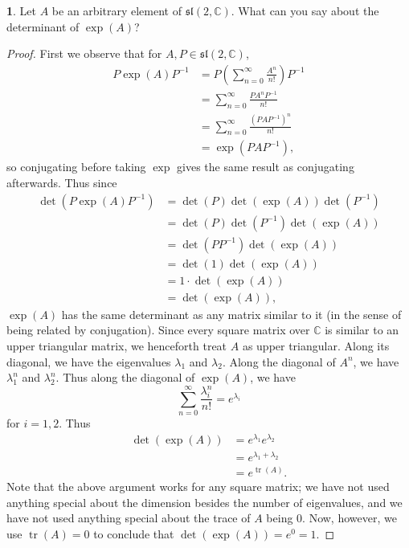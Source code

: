 \documentclass[12pt]{article}
\DeclareMathOperator{\tr}{tr}
\renewcommand{\sl}{\mathfrak{sl}}
\theoremstyle{definition}
\newtheorem{ex}{}
\begin{document}
\begin{ex}
	Let $A$ be an arbitrary element of $\sl(2, \mathbb{C})$.
	What can you say about the determinant of $\exp(A)$?
\end{ex}
\begin{proof}
	First we observe that for $A, P \in \sl(2, \mathbb{C})$, \begin{align*}
		P\exp(A)P^{-1} & = P\left(\sum_{n=0}^\infty \frac{A^n}{n!}\right)P^{-1} \\
		               & = \sum_{n=0}^\infty \frac{PA^nP^{-1}}{n!}              \\
		               & = \sum_{n=0}^\infty \frac{(PAP^{-1})^n}{n!}            \\
		               & = \exp(PAP^{-1}),
	\end{align*}
	so conjugating before taking $\exp$ gives the same result as conjugating afterwards.
	Thus since \begin{align*}
		\det(P\exp(A)P^{-1}) & = \det(P)\det(\exp(A))\det(P^{-1}) \\
		                     & = \det(P)\det(P^{-1})\det(\exp(A)) \\
		                     & = \det(PP^{-1})\det(\exp(A))       \\
		                     & = \det(1)\det(\exp(A))             \\
		                     & = 1\cdot\det(\exp(A))              \\
		                     & = \det(\exp(A)),
	\end{align*}
	$\exp(A)$ has the same determinant as any matrix similar to it (in the sense of being related by conjugation).
	Since every square matrix over $\mathbb{C}$ is similar to an upper triangular matrix, we henceforth treat $A$ as upper triangular.
	Along its diagonal, we have the eigenvalues $\lambda_1$ and $\lambda_2$.
	Along the diagonal of $A^n$, we have $\lambda_1^n$ and $\lambda_2^n$.
	Thus along the diagonal of $\exp(A)$, we have \begin{equation*}
		\sum_{n=0}^\infty \frac{\lambda_i^n}{n!} = e^{\lambda_i}
	\end{equation*}
	for $i=1,2$.
	Thus \begin{align*}
		\det(\exp(A)) & = e^{\lambda_1}e^{\lambda_2} \\
		              & = e^{\lambda_1 + \lambda_2}  \\
		              & = e^{\tr(A)}.
	\end{align*}
	Note that the above argument works for any square matrix; we have not used anything special about the dimension besides the number of eigenvalues, and we have not used anything special about the trace of $A$ being 0.
	Now, however, we use $\tr(A) = 0$ to conclude that $\det(\exp(A)) = e^0 = 1$.
\end{proof}
\end{document}
